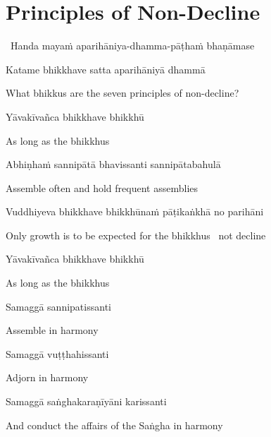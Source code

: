 \section{Principles of Non-Decline}
\label{principles-of-non-decline}

\begin{leader}
  \anglebracketleft\ \hspace{-0.5mm}Handa mayaṁ aparihāniya-dhamma-pāṭhaṁ bhaṇāmase \hspace{-0.5mm}\anglebracketright\
\end{leader}

Katame bhikkhave satta aparihāniyā dhammā

\begin{english}
  What bhikkus are the seven principles of non-decline?
\end{english}

Yāvakīvañca bhikkhave bhikkhū

\begin{english}
  As long as the bhikkhus
\end{english}

Abhiṇhaṁ sannipātā bhavissanti sannipātabahulā

\begin{english}
  Assemble often and hold frequent assemblies
\end{english}

Vuddhiyeva bhikkhave bhikkhūnaṁ pāṭikaṅkhā no parihāni

\begin{english}
  Only growth is to be expected for the bhikkhus \breathmark\ not decline
\end{english}

Yāvakīvañca bhikkhave bhikkhū

\begin{english}
  As long as the bhikkhus
\end{english}

Samaggā sannipatissanti

\begin{english}
  Assemble in harmony
\end{english}

Samaggā vuṭṭhahissanti

\begin{english}
  Adjorn in harmony
\end{english}

Samaggā saṅghakaraṇīyāni karissanti

\begin{english}
  And conduct the affairs of the Saṅgha in harmony
\end{english}

